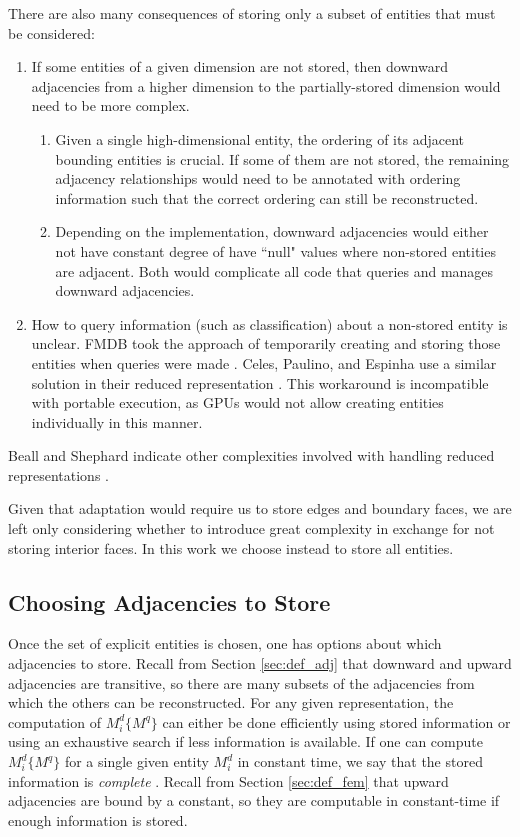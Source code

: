 There are also many consequences of storing only a subset of entities that
must be considered:
\begin{enumerate}
\item If some entities of a given dimension are not stored, then
downward adjacencies from a higher dimension to the partially-stored dimension
would need to be more complex.
\begin{enumerate}
\item Given a single high-dimensional entity, the ordering of its
adjacent bounding entities is crucial.
If some of them are not stored, the remaining adjacency relationships
would need to be annotated with ordering information such that the correct
ordering can still be reconstructed.
\item Depending on the implementation, downward adjacencies would either
not have constant degree of have ``null" values where non-stored entities
are adjacent.
Both would complicate all code that queries and manages
downward adjacencies.
\end{enumerate}
\item How to query information (such as classification) about a non-stored
entity is unclear. FMDB took the approach of temporarily creating
and storing those entities when queries were made \cite{seol2006efficient}.
Celes, Paulino, and Espinha use a similar solution in their reduced
representation \cite{celes2005compact}.
This workaround is incompatible with portable execution, as GPUs
would not allow creating entities individually in this manner.
\end{enumerate}
Beall and Shephard indicate other complexities involved
with handling reduced representations \cite{beall1997general}.

Given that adaptation would require us to store edges and boundary
faces, we are left only considering whether to introduce great
complexity in exchange for not storing interior faces.
In this work we choose instead to store all entities.

\subsection{Choosing Adjacencies to Store}

Once the set of explicit entities is chosen, one has
options about which adjacencies to store.
Recall from Section \ref{sec:def_adj} that downward and upward
adjacencies are transitive, so there are many
subsets of the adjacencies from which the others
can be reconstructed.
For any given representation, the computation of $M^d_i\{M^q\}$
can either be done efficiently using stored information
or using an exhaustive search if less information is available.
If one can compute $M^d_i\{M^q\}$ for a single
given entity $M^d_i$ in constant time,
we say that the stored information is {\it complete} \cite{seol2006efficient}.
Recall from Section \ref{sec:def_fem} that upward adjacencies
are bound by a constant, so they are computable in
constant-time if enough information is stored.

